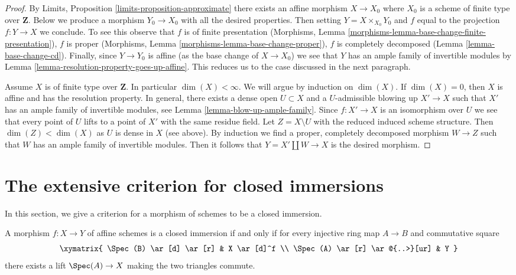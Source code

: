 \begin{proof}
By Limits, Proposition \ref{limits-proposition-approximate}
there exists an affine morphism $X \to X_0$ where $X_0$
is a scheme of finite type over $\mathbf{Z}$. Below we produce
a morphism $Y_0 \to X_0$ with all the desired properties.
Then setting $Y = X \times_{X_0} Y_0$ and $f$ equal to
the projection $f : Y \to X$ we conclude.
To see this observe that $f$ is of finite presentation
(Morphisms, Lemma \ref{morphisms-lemma-base-change-finite-presentation}),
$f$ is proper
(Morphisms, Lemma \ref{morphisms-lemma-base-change-proper}),
$f$ is completely decomposed
(Lemma \ref{lemma-base-change-cd}). Finally, since $Y \to Y_0$ is
affine (as the base change of $X \to X_0$) we see that $Y$ has
an ample family of invertible modules by
Lemma \ref{lemma-resolution-property-goes-up-affine}.
This reduces us to the case discussed in the next paragraph.

\medskip\noindent
Assume $X$ is of finite type over $\mathbf{Z}$. In particular
$\dim(X) < \infty$. We will argue by induction on $\dim(X)$.
If $\dim(X) = 0$, then $X$ is affine and has the resolution property.
In general, there exists a dense open $U \subset X$ and a
$U$-admissible blowing up $X' \to X$ such that $X'$ has
an ample family of invertible modules, see
Lemma \ref{lemma-blow-up-ample-family}.
Since $f : X' \to X$ is an isomorphism over $U$
we see that every point of $U$ lifts to a point of $X'$
with the same residue field.
Let $Z = X \setminus U$ with the reduced induced scheme structure.
Then $\dim(Z) < \dim(X)$ as $U$ is dense in $X$ (see above).
By induction we find a proper, completely decomposed
morphism $W \to Z$ such that $W$ has an ample family of invertible
modules. Then it follows that $Y = X' \amalg W \to X$ is the desired
morphism.
\end{proof}




\section{The extensive criterion for closed immersions}
\label{section-extensive-criterion-closed-immersions}

\noindent
In this section, we give a criterion for a morphism of schemes 
to be a closed immersion.

\begin{lemma}
\label{lemma-affine-extensive-criterion}
A morphism $f : X \to Y$ of affine schemes is a closed immersion 
if and only if for every injective ring map $A \to B$ and commutative 
square
$$
\xymatrix{
\Spec(B) \ar[d] \ar[r] & X \ar[d]^f \\
\Spec(A) \ar[r] \ar@{..>}[ur] & Y
}
$$
there exists a lift $\Spec(A) \to X$ making the two triangles commute.
\end{lemma}

